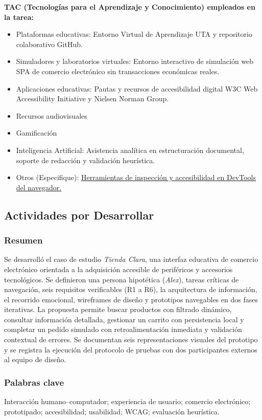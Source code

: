 \documentclass{article}
\begin{document}
\textbf{TAC (Tecnologías para el Aprendizaje y Conocimiento) empleados en la tarea:}
\begin{itemize}
    \item[$\blacksquare$] Plataformas educativas: Entorno Virtual de Aprendizaje UTA y repositorio colaborativo GitHub.
    \item[$\blacksquare$] Simuladores y laboratorios virtuales: Entorno interactivo de simulación web SPA de comercio electrónico sin transacciones económicas reales.
    \item[$\blacksquare$] Aplicaciones educativas: Pautas y recursos de accesibilidad digital W3C Web Accessibility Initiative y Nielsen Norman Group.
    \item[$\square$] Recursos audiovisuales
    \item[$\square$] Gamificación
    \item[$\blacksquare$] Inteligencia Artificial: Asistencia analítica en estructuración documental, soporte de redacción y validación heurística.
    \item Otros (Especifique): \underline{Herramientas de inspección y accesibilidad en DevTools del navegador.}
\end{itemize}

\subsection{Actividades por Desarrollar}

\subsubsection{Resumen}
Se desarrolló el caso de estudio \textit{Tienda Clara}, una interfaz educativa de comercio electrónico orientada a la adquisición accesible de periféricos y accesorios tecnológicos. Se definieron una persona hipotética (\textit{Alex}), tareas críticas de navegación, seis requisitos verificables (R1 a R6), la arquitectura de información, el recorrido emocional, wireframes de diseño y prototipos navegables en dos fases iterativas. La propuesta permite buscar productos con filtrado dinámico, consultar información detallada, gestionar un carrito con persistencia local y completar un pedido simulado con retroalimentación inmediata y validación contextual de errores. Se documentan seis representaciones visuales del prototipo y se registra la ejecución del protocolo de pruebas con dos participantes externos al equipo de diseño.

\subsubsection{Palabras clave}
Interacción humano–computador; experiencia de usuario; comercio electrónico; prototipado; accesibilidad; usabilidad; WCAG; evaluación heurística.
\end{document}
